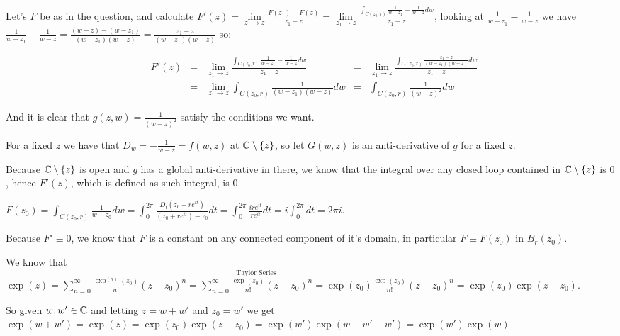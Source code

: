 \begin{cExercise}
	\begin{cPart}
		Let's $F$ be as in the question, and calculate $F'(z)=\lim\limits_{z_1\to z}\frac{F(z_1)-F(z)}{z_1-z}=\lim\limits_{z_1\to z}\frac{\int_{C(z_0,r)}\frac{1}{w-z_1}-\frac{1}{w-z}dw}{z_1-z}$, looking at $\frac{1}{w-z_1}-\frac{1}{w-z}$ we have $\frac{1}{w-z_1}-\frac{1}{w-z}=\frac{(w-z)-(w-z_1)}{(w-z_1)(w-z)}=\frac{z_1-z}{(w-z_1)(w-z)}$ so:
		
		\begin{align*}
			&F'(z)&=&\lim\limits_{z_1\to z}\frac{\int_{C(z_0,r)}\frac{1}{w-z_1}-\frac{1}{w-z}dw}{z_1-z}&=&\lim\limits_{z_1\to z}\frac{\int_{C(z_0,r)}\frac{z_1-z}{(w-z_1)(w-z)}dw}{z_1-z}\\
			&&=&\lim\limits_{z_1\to z}\int_{C(z_0,r)}\frac{1}{(w-z_1)(w-z)}dw&=&\int_{C(z_0,r)}\frac{1}{(w-z)^2}dw
		\end{align*}
		
		And it is clear that $g(z,w)=\frac1{(w-z)^2}$ satisfy the conditions we want.
	\end{cPart}
	\begin{cPart}
		For a fixed $z$ we have that $D_w =-\frac1{w-z}=f(w,z)$ at $\mathbb C\setminus\{z\}$, so let $G(w,z)$ is an anti-derivative of $g$ for a fixed $z$. 
		
		Because $\mathbb C\setminus\{z\}$ is open and $g$ has a global anti-derivative in there, we know that the integral over any closed loop contained in $\mathbb C\setminus\{z\}$ is $0$, hence $F'(z)$, which is defined as such integral, is $0$ 
	\end{cPart}
	\begin{cPart}
		$F(z_0)=\int_{C(z_0,r)}\frac1{w-z_0}dw=\int_0^{2\pi}\frac{D_t(z_0+re^{it})}{(z_0+re^{it})-z_0}dt=\int_0^{2\pi}\frac{ire^{it}}{re^{it}}dt=i\int_0^{2\pi}dt=2\pi i$.
		
		Because $F'\equiv 0$, we know that $F$ is a constant on any connected component of it's domain, in particular $F\equiv F(z_0)$ in $B_r(z_0)$.
	\end{cPart}
\end{cExercise}
\begin{cExercise}
	We know that $\exp(z)=\sum_{n=0}^{\infty} \frac{\exp^{(n)}(z_0)}{n!}(z-z_0)^n=\overset{\text{Taylor Series}}{\sum_{n=0}^{\infty} \frac{\exp(z_0)}{n!}(z-z_0)^n}=\exp(z_0)\frac{\exp(z_0)}{n!}(z-z_0)^n=\exp(z_0)\exp(z-z_0)$.
	
	So given $w,w'\in \mathbb C$ and letting $z=w+w'$ and $z_0=w'$ we get $\exp(w+w')=\exp(z)=\exp(z_0)\exp(z-z_0)=\exp(w')\exp(w+w'-w')=\exp(w')\exp(w)$
\end{cExercise}
